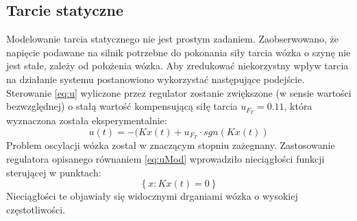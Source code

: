\subsection{Tarcie statyczne}
Modelowanie tarcia statycznego nie jest prostym zadaniem. Zaobserwowano, że napięcie podawane na silnik potrzebne do pokonania siły tarcia wózka o szynę nie jest stałe, zależy od położenia wózka. Aby zredukować niekorzystny wpływ tarcia na działanie systemu postanowiono wykorzystać następujące podejście. Sterowanie \ref{eq:u} wyliczone przez regulator zostanie zwiększone (w sensie wartości bezwzględnej) o stałą wartość kompensującą siłę tarcia $u_{F_T}=0.11$, która wyznaczona została eksperymentalnie:
\begin{equation}
\label{eq:uMod}
u(t) = -(Kx(t)+u_{F_T}\cdot sgn(Kx(t))
\end{equation}
Problem oscylacji wózka został w znaczącym stopniu zażegnany. Zastosowanie regulatora opisanego równaniem \ref{eq:uMod}  wprowadziło nieciągłości funkcji sterującej w punktach:
 \begin{equation}
\left\lbrace x: Kx(t)=0\right\rbrace 
\end{equation}
Nieciągłości te objawiały się widocznymi drganiami wózka o wysokiej częstotliwości.
